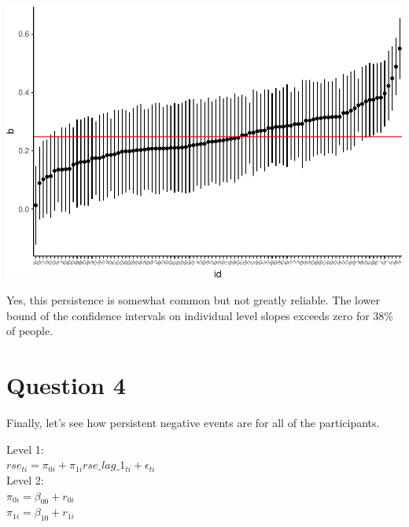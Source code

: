 \documentclass[]{article}
\newenvironment{Shaded}{\begin{snugshade}}{\end{snugshade}}
\newcommand{\KeywordTok}[1]{\textcolor[rgb]{0.13,0.29,0.53}{\textbf{#1}}}
\newcommand{\DataTypeTok}[1]{\textcolor[rgb]{0.13,0.29,0.53}{#1}}
\newcommand{\FloatTok}[1]{\textcolor[rgb]{0.00,0.00,0.81}{#1}}
\newcommand{\StringTok}[1]{\textcolor[rgb]{0.31,0.60,0.02}{#1}}
\newcommand{\OperatorTok}[1]{\textcolor[rgb]{0.81,0.36,0.00}{\textbf{#1}}}
\newcommand{\NormalTok}[1]{#1}
\begin{document}
\includegraphics{Beck_HW_7_R_2_files/figure-latex/unnamed-chunk-6-1.pdf}

\begin{Shaded}
\end{Shaded}

Yes, this persistence is somewhat common but not greatly reliable. The
lower bound of the confidence intervals on individual level slopes
exceeds zero for 38\% of people.

\section{Question 4}\label{question-4}

Finally, let's see how persistent negative events are for all of the
participants.

Level 1:\\
\(rse_{ti} = \pi_{0i} + \pi_{1i}rse\_lag\_1_{ti} + \epsilon_{ti}\)\\
Level 2:\\
\(\pi_{0i} = \beta_{00} + r_{0i}\)\\
\(\pi_{1i} = \beta_{10} + r_{1i}\)
\end{document}
